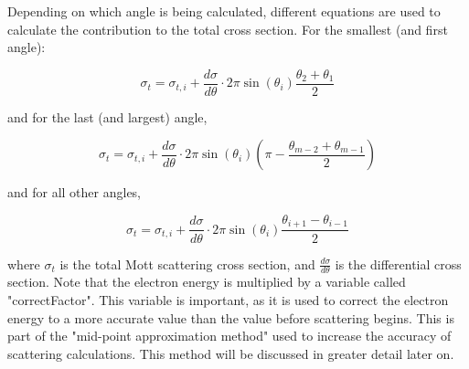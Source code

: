 \documentclass[10pt, reqno]{exam}
\begin{document}
Depending on which angle is being calculated, different equations are used to calculate the contribution to the total cross section. For the smallest (and first angle):

\begin{equation}
    \sigma_{t} = \sigma_{t,i} + \frac{d\sigma}{d\theta}\cdot 2\pi \sin(\theta_i)\frac{\theta_2 + \theta_1}{2}
\end{equation}

and for the last (and largest) angle,

\begin{equation}
    \sigma_{t} = \sigma_{t,i} + \frac{d\sigma}{d\theta}\cdot 2\pi \sin(\theta_i)\left( \pi - \frac{\theta_{m-2} + \theta_{m-1}}{2}\right)
\end{equation}

and for all other angles,

\begin{equation}
    \sigma_{t} = \sigma_{t,i} + \frac{d\sigma}{d\theta}\cdot 2\pi \sin(\theta_i)\frac{\theta_{i+1} - \theta_{i-1}}{2}
\end{equation}

where $\sigma_{t}$ is the total Mott scattering cross section, and $\frac{d\sigma}{d\theta}$ is the differential cross section. Note that the electron energy is multiplied by a variable called "correctFactor". This variable is important, as it is used to correct the electron energy to a more accurate value than the value before scattering begins. This is part of the "mid-point approximation method" used to increase the accuracy of scattering calculations. This method will be discussed in greater detail later on.
\end{document}

